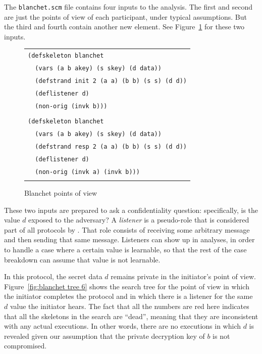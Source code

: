 The \texttt{blanchet.scm} file contains four inputs to the analysis.
The first and second are just the points of view of each participant,
under typical assumptions.  But the third and fourth contain another
new element.  See Figure~\ref{fig:blanchet pov3-4} for these two
inputs.

\begin{figure}
\centering
\begin{tabular}{l}
\verb|(defskeleton blanchet|\\
\verb|  (vars (a b akey) (s skey) (d data))|\\
\verb|  (defstrand init 2 (a a) (b b) (s s) (d d))|\\
\verb|  (deflistener d)|\\
\verb|  (non-orig (invk b)))|\\\\
\verb|(defskeleton blanchet|\\
\verb|  (vars (a b akey) (s skey) (d data))|\\
\verb|  (defstrand resp 2 (a a) (b b) (s s) (d d))|\\
\verb|  (deflistener d)|\\
\verb|  (non-orig (invk a) (invk b)))|\\\\
\end{tabular}
\caption{Blanchet points of view}
\label{fig:blanchet pov3-4}
\end{figure}

 These two inputs are prepared to
ask a confidentiality question: specifically, is the value $d$ exposed
to the adversary?  A \emph{listener} is a pseudo-role that is
considered part of all protocols by {\cpsa}.  That role consists of
receiving some arbitrary message and then sending that same message.
Listeners can show up in {\cpsa} analyses, in order to handle a case
where a certain value is learnable, so that the rest of the case
breakdown can assume that value is not learnable.

In this protocol, the secret data $d$ remains private in the
initiator's point of view.  Figure~\ref{fig:blanchet tree 6} shows the
search tree for the point of view in which the initiator completes the
protocol and in which there is a listener for the same $d$ value the
initiator hears.  The fact that all the numbers are red here indicates
that all the skeletons in the search are ``dead'', meaning that they are
inconsistent with any actual executions.  In other words, there are no
executions in which $d$ is revealed given our assumption that the private
decryption key of $b$ is not compromised.

